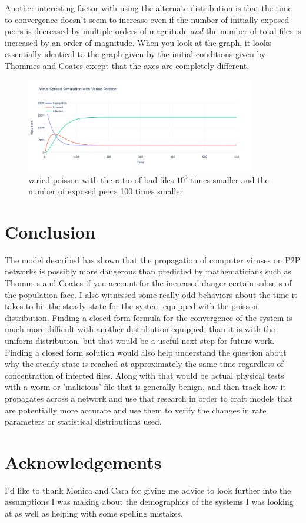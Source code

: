 \documentclass[12pt, oneside]{article}
\begin{document}
        Another interesting factor with using the alternate distribution is that the time to convergence doesn't seem to increase even if the number of initially exposed peers is decreased by multiple orders of magnitude \textit{and}
        the number of total files is increased by an order of magnitude. When you look at the graph, it looks essentially identical to the graph given by the initial conditions given by Thommes and Coates except that the axes are completely
        different.
        \begin{figure}[htbp]
            \centering
            \includegraphics[width=0.9\textwidth]{HUGESUSCEPTIBLEPOISSON.png}
            \caption{varied poisson with the ratio of bad files $10^3$ times smaller and the number of exposed peers 100 times smaller }
        \end{figure}
    
    \section{Conclusion}
        The model described has shown that the propagation of computer viruses on P2P networks is possibly more dangerous than predicted by mathematicians such as Thommes and Coates if
        you account for the increased danger certain subsets of the population face. I also witnessed some really odd behaviors about the time it takes to hit the steady state for the system 
        equipped with the poisson distribution. Finding a closed form formula for the convergence of the system is much more difficult with another distribution equipped, 
        than it is with the uniform distribution, but that would be a useful next step for future work. Finding a closed form solution would also help understand the question about why the 
        steady state is reached at approximately the same time regardless of concentration of infected files. Along with that would be actual physical tests with a worm or 'malicious' file that is generally benign,
        and then track how it propagates across a network and use that research in order to craft models that are potentially more accurate and use them to verify the changes in rate parameters or statistical
        distributions used.
    \section{Acknowledgements}
        I'd like to thank Monica and Cara for giving me advice to look further into the assumptions I was making about the demographics of the systems I was looking at as well as helping with some spelling mistakes.



\end{document}
